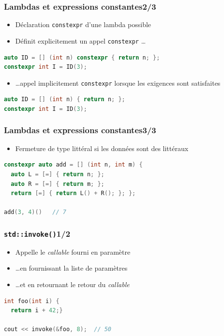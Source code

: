 \documentclass[C++.tex]{subfiles}
\begin{document}
\begin{frame}[fragile]
	\frametitle{Lambdas et expressions constantes\titlehfill{}2/3}
	\begin{itemize}
		\item Déclaration \lstinline|constexpr| d'une lambda possible 
		\item Définit explicitement un appel \lstinline|constexpr| \ldots
	\end{itemize}

	\begin{lstlisting}[language=C++]
auto ID = [] (int n) constexpr { return n; };
constexpr int I = ID(3);\end{lstlisting}

	\begin{itemize}
		\item \ldots{}appel implicitement \lstinline|constexpr| lorsque les exigences sont satisfaites
	\end{itemize}


	\begin{lstlisting}[language=C++]
auto ID = [] (int n) { return n; };
constexpr int I = ID(3);\end{lstlisting}
\end{frame}

\begin{frame}[fragile]
	\frametitle{Lambdas et expressions constantes\titlehfill{}3/3}
	\begin{itemize}
		\item Fermeture de type littéral si les données sont des littéraux
	\end{itemize}

	\begin{lstlisting}[language=C++]
constexpr auto add = [] (int n, int m) {
  auto L = [=] { return n; };
  auto R = [=] { return m; };
  return [=] { return L() + R(); }; };

add(3, 4)()   // 7\end{lstlisting}
\end{frame}

\begin{frame}[fragile]
	\frametitle{\lstinline|std::invoke()|\titlehfill{}1/2}
	\begin{itemize}
		\item Appelle le \textit{callable} fourni en paramètre
		\item \ldots en fournissant la liste de paramètres
		\item \ldots et en retournant le retour du \textit{callable}
	\end{itemize}

	\begin{lstlisting}[language=C++]
int foo(int i) {
  return i + 42;}

cout << invoke(&foo, 8);  // 50\end{lstlisting}
\end{frame}
\end{document}
